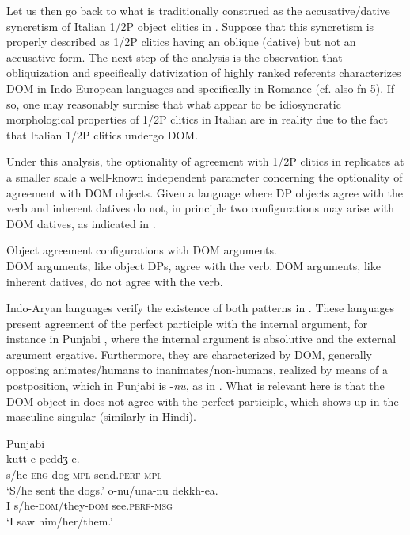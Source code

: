 \documentclass[output=paper,colorlinks,citecolor=brown,nonflat]{./langscibook}
\begin{document}
Let us then go back to what is traditionally construed as the accusative/dative syncretism of Italian 1/2P object clitics in .  Suppose that this syncretism is properly described as 1/2P clitics having an oblique (dative) but not an accusative form. The next step of the analysis is the observation that obliquization and specifically dativization of highly ranked referents characterizes DOM in Indo-European languages and specifically in Romance (cf. also fn 5).  If so, one may reasonably surmise that what appear to be idiosyncratic morphological properties of 1/2P clitics in Italian are in reality due to the fact that Italian 1/2P clitics undergo DOM. 

Under this analysis, the optionality of agreement with 1/2P clitics in  replicates at a smaller scale a well-known independent parameter concerning the optionality of agreement with DOM objects. Given a language where DP objects agree with the verb and inherent datives do not, in principle two configurations may arise with DOM datives, as indicated in .

\ea%
    \label{ex:manzini:17}
    Object agreement configurations with DOM arguments. \\
    \ea\label{ex:manzini:17a} 
    DOM arguments, like object DPs, agree with the verb.
    \ex\label{ex:manzini:17b} 
    DOM arguments, like inherent datives, do not agree with the verb.
    \z
\z

Indo-Aryan languages verify the existence of both patterns in . These languages present agreement of the perfect participle with the internal argument, for instance in Punjabi , where the internal argument is absolutive and the external argument ergative. Furthermore, they are characterized by DOM, generally opposing animates/humans to inanimates/non-humans, realized by means of a postposition, which in Punjabi is -\textit{nu}, as in . What is relevant here is that the DOM object in  does not agree with the perfect participle, which shows up in the masculine singular (similarly in Hindi).

\ea%
    \label{ex:manzini:18}
    Punjabi \citep{ManziniSavoiaFranco2015}\\
    \ea\label{ex:manzini:18a} 
         {kutt-e}     {peddʒ-e}.\\
        s/he-\textsc{erg}   dog-\textsc{mpl}   send.\textsc{perf-mpl}\\
    \glt ‘S/he sent the dogs.’  
    \ex\label{ex:manzini:18b} 
       {o-nu/una-nu}       {dekkh-ea}.\\
        I   s/he\textsc{{}-dom}/they\textsc{{}-dom}    see.\textsc{perf-msg}\\
    \glt ‘I saw him/her/them.’
    \z 
\z 
\end{document}
